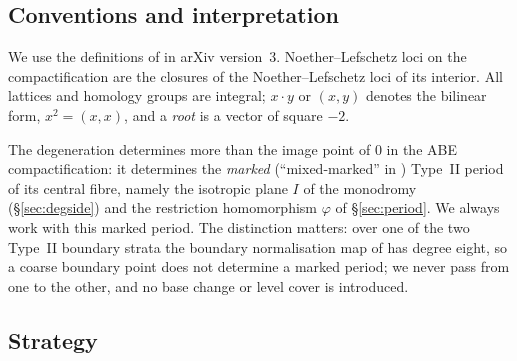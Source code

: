 \documentclass[12pt]{article}
\theoremstyle{definition}
\theoremstyle{remark}
\begin{document}
\subsection{Conventions and interpretation}\label{sec:conventions}

We use the definitions of \cite{GT} in arXiv version~3.
Noether--Lefschetz loci on the compactification are the closures of
the Noether--Lefschetz loci of its interior. All lattices and homology
groups are integral; \(x\cdot y\) or \((x,y)\) denotes the bilinear
form, \(x^2=(x,x)\), and a \emph{root} is a vector of square \(-2\).

The degeneration determines more than the image point of \(0\) in the
ABE compactification: it determines the \emph{marked} (``mixed-marked''
in \cite{AE}) Type~II period of its central fibre, namely the isotropic
plane \(I\) of the monodromy (\S\ref{sec:degside}) and the restriction
homomorphism \(\varphi\) of \S\ref{sec:period}. We always work with
this marked period. The distinction matters: over one of the two
Type~II boundary strata the boundary normalisation map of
\cite[Theorem~7.58]{ABE} has degree eight, so a coarse boundary point
does not determine a marked period; we never pass from one to the
other, and no base change or level cover is introduced.

\subsection{Strategy}\label{sec:strategy}
\end{document}
